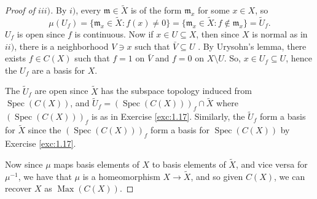 \documentclass[12pt,letterpaper]{article}
\theoremstyle{definition}
\theoremstyle{remark}
\numberwithin{figure}{problem}
\numberwithin{equation}{section}
\DeclareMathOperator{\Spec}{Spec}
\DeclareMathOperator{\Max}{Max}
\begin{document}
\begin{proof}[Proof of
  $iii)$]
  By
  $i)$, every
  $\mathfrak{m} \in
  \tilde{X}$ is of the form
  $\mathfrak{m}_x$ for some
  $x \in
  X$, so
  \begin{equation*}
    \mu(U_f) = \{\mathfrak{m}_x \in \tilde{X} : f(x) \ne 0\} = \{\mathfrak{m}_x \in \tilde{X} : f \notin \mathfrak{m}_x\} = \tilde{U}_f.
  \end{equation*}
  $U_f$ is open since
  $f$ is continuous.
  Now if
  $x \in U \subseteq
  X$, then since
  $X$ is normal as in
  $ii)$, there is a neighborhood
  $V \ni
  x$ such that
  $\bar{V} \subseteq
  U$ \cite[Lem.~$31.1(b)$]{Mun00}.
  By Urysohn's lemma, there exists
  $f \in
  C(X)$ such that
  $f =
  1$ on
  $\bar{V}$ and
  $f =
  0$ on
  $X \setminus
  U$.
  So,
  $x \in U_f \subseteq
  U$, hence the
  $U_f$ are a basis for
  $X$.
  \par The
  $\tilde{U}_f$ are open since
  $\tilde{X}$ has the subspace topology induced from
  $\Spec(C(X))$, and
  $\tilde{U}_f = (\Spec(C(X)))_f \cap
  \tilde{X}$ where
  $(\Spec(C(X)))_f$ is as in Exercise \ref{exc:1.17}.
  Similarly, the
  $\tilde{U}_f$ form a basis for
  $\tilde{X}$ since the
  $(\Spec(C(X)))_f$ form a basis for
  $\Spec(C(X))$ by Exercise \ref{exc:1.17}.
  \par Now since
  $\mu$ maps basis elements of
  $X$ to basis elements of
  $\tilde{X}$, and vice versa for
  $\mu^{-1}$, we have that
  $\mu$ is a homeomorphism
  $X \to
  \tilde{X}$, and so given
  $C(X)$, we can recover
  $X$ as
  $\Max(C(X))$.
\end{proof}
\end{document}

